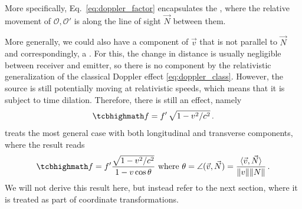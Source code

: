 \documentclass[../relativity_main.tex]{subfiles}
\begin{document}
More specifically, Eq.~\eqref{eq:doppler_factor} encapsulates the , where the relative movement of $\mathcal{O}, \mathcal{O}'$ is along the line of sight $\vec{N}$ between them.

More generally, we could also have a component of $\vec{v}$ that is not parallel to $\vec{N}$ and correspondingly, a . For this, the change in distance is usually negligible between receiver and emitter, so there is no component by the relativistic generalization of the classical Doppler effect \eqref{eq:doppler_class}. However, the source is still potentially moving at relativistic speeds, which means that it is subject to time dilation. Therefore, there is still an effect, namely
\begin{equation}
	\eqbox{f = f' \, \sqrt{1 - v^2 / c^2}} \, .
\end{equation}
\cite{dragon_geometry_srt} treats the most general case with both longitudinal and transverse components, where the result reads
\begin{equation}
	\eqbox{f = f' \frac{\sqrt{1 - v^2 / c^2}}{1 - v \cos \theta}} \text{ where } \theta = \angle(\vec{v}, \vec{N}) = \frac{\langle \vec{v}, \vec{N} \rangle}{\norm{v} \norm{N}} \, .
\end{equation}
We will not derive this result here, but instead refer to the next section, where it is treated as part of coordinate transformations.
\\
\end{document}
